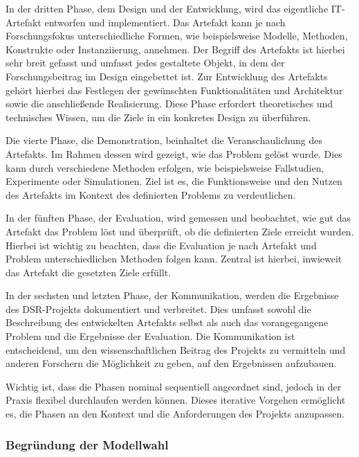 In der dritten Phase, dem Design und der Entwicklung, wird das eigentliche IT-Artefakt entworfen und implementiert. Das Artefakt kann je nach Forschungsfokus unterschiedliche Formen, wie beispielsweise Modelle, Methoden, Konstrukte oder Instanziierung, annehmen. Der Begriff des Artefakts ist hierbei sehr breit gefasst und umfasst jedes gestaltete Objekt, in dem der Forschungsbeitrag im Design eingebettet ist. Zur Entwicklung des Artefakts gehört hierbei das Festlegen der gewünschten Funktionalitäten und Architektur sowie die anschließende Realisierung. Diese Phase erfordert theoretisches und technisches Wissen, um die Ziele in ein konkretes Design zu überführen. \cite[]{peffers_design_2007}

Die vierte Phase, die Demonstration, beinhaltet die Veranschaulichung des Artefakts. Im Rahmen dessen wird gezeigt, wie das Problem gelöst wurde. Dies kann durch verschiedene Methoden erfolgen, wie beispielsweise Fallstudien, Experimente oder Simulationen. Ziel ist es, die Funktionsweise und den Nutzen des Artefakts im Kontext des definierten Problems zu verdeutlichen. \cite[]{peffers_design_2007}

In der fünften Phase, der Evaluation, wird gemessen und beobachtet, wie gut das Artefakt das Problem löst und überprüft, ob die definierten Ziele erreicht wurden. Hierbei ist wichtig zu beachten, dass die Evaluation je nach Artefakt und Problem unterschiedlichen Methoden folgen kann. Zentral ist hierbei, inwieweit das Artefakt die gesetzten Ziele erfüllt. \cite[]{peffers_design_2007}

In der sechsten und letzten Phase, der Kommunikation, werden die Ergebnisse des \ac{DSR}-Projekts dokumentiert und verbreitet. Dies umfasst sowohl die Beschreibung des entwickelten Artefakts selbst als auch das vorangegangene Problem und die Ergebnisse der Evaluation. Die Kommunikation ist entscheidend, um den wissenschaftlichen Beitrag des Projekts zu vermitteln und anderen Forschern die Möglichkeit zu geben, auf den Ergebnissen aufzubauen. \cite[]{peffers_design_2007}

Wichtig ist, dass die Phasen nominal sequentiell angeordnet sind, jedoch in der Praxis flexibel durchlaufen werden können. Dieses iterative Vorgehen ermöglicht es, die Phasen an den Kontext und die Anforderungen des Projekts anzupassen. \cite[]{peffers_design_2007}

\subsubsection{Begründung der Modellwahl}

